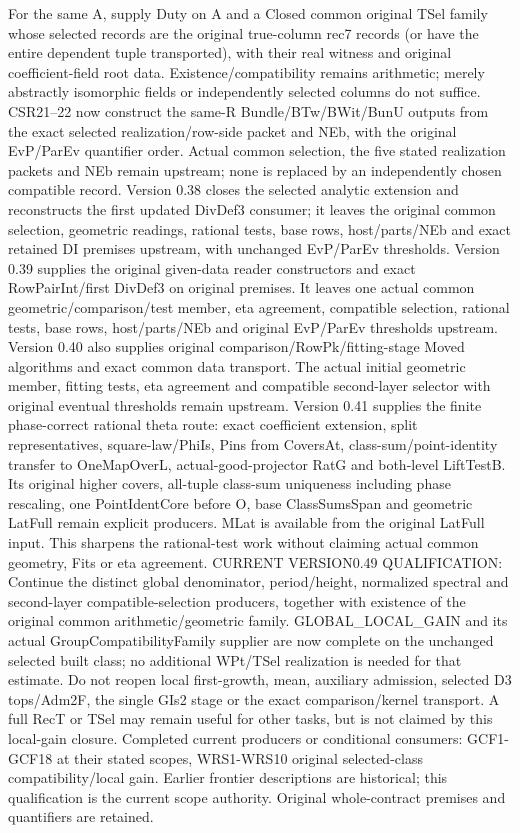 \documentclass[11pt,a4paper]{article}
\numberwithin{equation}{section}
\theoremstyle{remark}\newtheorem{remark}[theorem]{Remark}
\begin{document}
For the same A, supply Duty on A and a Closed common original TSel family whose selected records are the original true-column rec7 records (or have the entire dependent tuple transported), with their real witness and original coefficient-field root data. Existence/compatibility remains arithmetic; merely abstractly isomorphic fields or independently selected columns do not suffice. CSR21–22 now construct the same-R Bundle/BTw/BWit/BunU outputs from the exact selected realization/row-side packet and NEb, with the original EvP/ParEv quantifier order. Actual common selection, the five stated realization packets and NEb remain upstream; none is replaced by an independently chosen compatible record. Version 0.38 closes the selected analytic extension and reconstructs the first updated DivDef3 consumer; it leaves the original common selection, geometric readings, rational tests, base rows, host/parts/NEb and exact retained DI premises upstream, with unchanged EvP/ParEv thresholds. Version 0.39 supplies the original given-data reader constructors and exact RowPairInt/first DivDef3 on original premises. It leaves one actual common geometric/comparison/test member, eta agreement, compatible selection, rational tests, base rows, host/parts/NEb and original EvP/ParEv thresholds upstream. Version 0.40 also supplies original comparison/RowPk/fitting-stage Moved algorithms and exact common data transport. The actual initial geometric member, fitting tests, eta agreement and compatible second-layer selector with original eventual thresholds remain upstream. Version 0.41 supplies the finite phase-correct rational theta route: exact coefficient extension, split representatives, square-law/PhiIs, Pins from CoversAt, class-sum/point-identity transfer to OneMapOverL, actual-good-projector RatG and both-level LiftTestB. Its original higher covers, all-tuple class-sum uniqueness including phase rescaling, one PointIdentCore before O, base ClassSumsSpan and geometric LatFull remain explicit producers. MLat is available from the original LatFull input. This sharpens the rational-test work without claiming actual common geometry, Fits or eta agreement. CURRENT VERSION0.49 QUALIFICATION: Continue the distinct global denominator, period/height, normalized spectral and second-layer compatible-selection producers, together with existence of the original common arithmetic/geometric family. GLOBAL\_\allowbreak LOCAL\_\allowbreak GAIN and its actual GroupCompatibilityFamily supplier are now complete on the unchanged selected built class; no additional WPt/TSel realization is needed for that estimate. Do not reopen local first-growth, mean, auxiliary admission, selected D3 tops/Adm2F, the single GIs2 stage or the exact comparison/kernel transport. A full RecT or TSel may remain useful for other tasks, but is not claimed by this local-gain closure. Completed current producers or conditional consumers: GCF1-GCF18 at their stated scopes, WRS1-WRS10 original selected-class compatibility/local gain. Earlier frontier descriptions are historical; this qualification is the current scope authority. Original whole-contract premises and quantifiers are retained.
\end{document}
